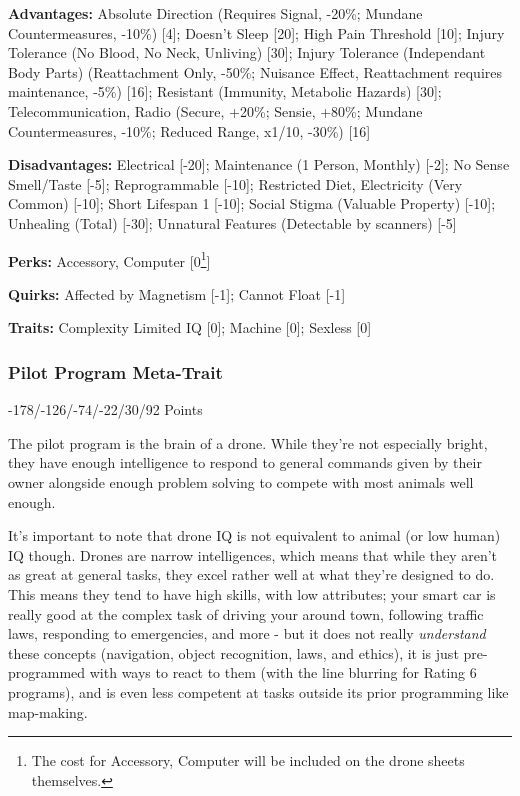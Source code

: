 \textbf{Advantages:} 
Absolute Direction (Requires Signal, -20\%; Mundane Countermeasures, -10\%) [4]; Doesn't Sleep [20]; High Pain Threshold [10]; Injury Tolerance (No Blood, No Neck, Unliving) [30]; Injury Tolerance (Independant Body Parts) (Reattachment Only, -50\%; Nuisance Effect, Reattachment requires maintenance, -5\%) [16]; Resistant (Immunity, Metabolic Hazards) [30]; Telecommunication, Radio (Secure, +20\%; Sensie, +80\%; Mundane Countermeasures, -10\%; Reduced Range, x1/10, -30\%) [16]

\textbf{Disadvantages:} 
Electrical [-20]; Maintenance (1 Person, Monthly) [-2]; No Sense Smell/Taste [-5]; Reprogrammable [-10]; Restricted Diet, Electricity (Very Common) [-10]; Short Lifespan 1 [-10]; Social Stigma (Valuable Property) [-10]; Unhealing (Total) [-30]; Unnatural Features (Detectable by scanners) [-5]

\textbf{Perks:}
Accessory, Computer [0\footnote{The cost for Accessory, Computer will be included on the drone sheets themselves.}]

\textbf{Quirks:}
Affected by Magnetism [-1]; Cannot Float [-1]

\textbf{Traits:}
Complexity Limited IQ [0]; Machine [0]; Sexless [0]

\subsubsection{Pilot Program Meta-Trait}
\begin{flushright}
	-178/-126/-74/-22/30/92 Points
\end{flushright}

The pilot program is the brain of a drone. While they're not especially bright, they have enough intelligence to respond to general commands given by their owner alongside enough problem solving to compete with most animals well enough. 

It's important to note that drone IQ is not equivalent to animal (or low human) IQ though. Drones are narrow intelligences, which means that while they aren't as great at general tasks, they excel rather well at what they're designed to do. This means they tend to have high skills, with low attributes; your smart car is really good at the complex task of driving your around town, following traffic laws, responding to emergencies, and more - but it does not really \textit{understand} these concepts (navigation, object recognition, laws, and ethics), it is just pre-programmed with ways to react to them (with the line blurring for Rating 6 programs), and is even less competent at tasks outside its prior programming like map-making.

